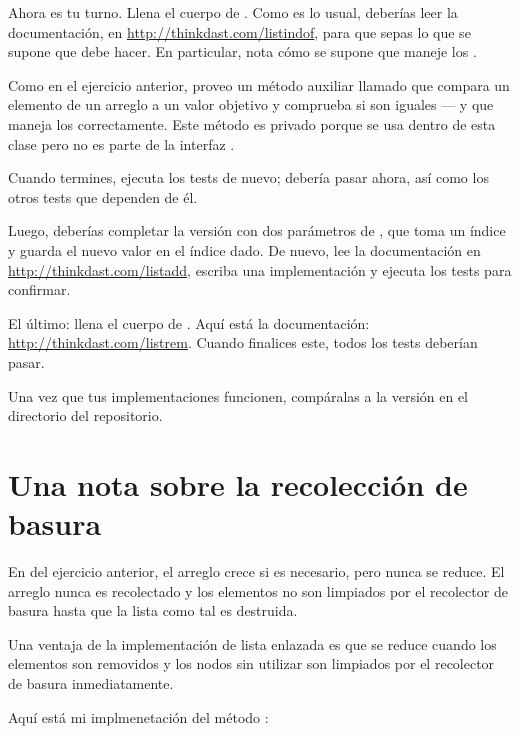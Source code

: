 \documentclass[12pt]{book}
\theoremstyle{exercise}
\begin{document}
Ahora es tu turno. Llena el cuerpo de .  Como es lo usual,
deberías leer la documentación, en
\url{http://thinkdast.com/listindof},
para que sepas lo que se supone que debe hacer. En particular, nota cómo se
supone que maneje los .


Como en el ejercicio anterior, proveo un método auxiliar llamado
 que compara un elemento de un arreglo a un valor objetivo
y comprueba si son iguales --- y que maneja los 
correctamente. Este método es privado porque se usa dentro de esta clase
pero no es parte de la interfaz .

Cuando termines, ejecuta los tests de nuevo; 
debería pasar ahora, así como los otros tests que dependen de él.


Luego, deberías completar la versión con dos parámetros de ,
que toma un índice y guarda el nuevo valor en el índice dado.
De nuevo, lee la documentación en \url{http://thinkdast.com/listadd},
escriba una implementación y ejecuta los tests para confirmar.


El último: llena el cuerpo de .  Aquí está la documentación:
\url{http://thinkdast.com/listrem}.  Cuando finalices este, todos los tests
deberían pasar.

Una vez que tus implementaciones funcionen, compáralas a la versión
en el directorio  del repositorio.


\section{Una nota sobre la recolección de basura}
\label{a-note-on-garbage-collection}

En  del ejercicio anterior, el arreglo crece si es
necesario, pero nunca se reduce. El arreglo nunca es recolectado y los
elementos no son limpiados por el recolector de basura hasta que la lista
como tal es destruida.


Una ventaja de la implementación de lista enlazada es que se reduce cuando
los elementos son removidos y los nodos sin utilizar son limpiados por el
recolector de basura inmediatamente.


Aquí está mi implmenetación del método :
\end{document}
